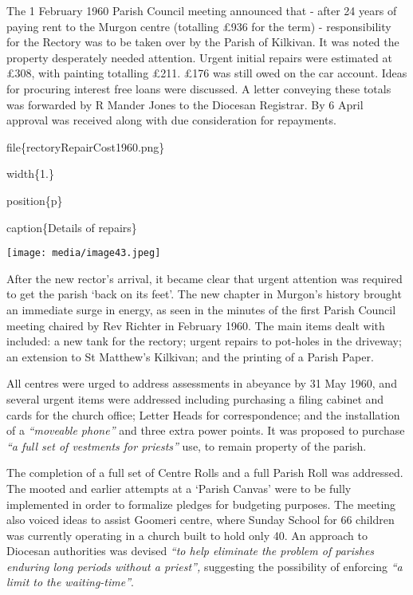 The 1 February 1960 Parish Council meeting announced that - after 24 years of paying rent to the Murgon centre (totalling £936 for the term) - responsibility for the Rectory was to be taken over by the Parish of Kilkivan. It was noted the property desperately needed attention. Urgent initial repairs were estimated at £308, with painting totalling £211. £176 was still owed on the car account. Ideas for procuring interest free loans were discussed. A letter conveying these totals was forwarded by R Mander Jones to the Diocesan Registrar. By 6 April approval was received along with due consideration for repayments.

file\{rectoryRepairCost1960.png\}

width\{1.\}

position\{p\}

caption\{Details of repairs\}

\texttt{[image: media/image43.jpeg]}

After the new rector's arrival, it became clear that urgent attention was required to get the parish `back on its feet'. The new chapter in Murgon's history brought an immediate surge in energy, as seen in the minutes of the first Parish Council meeting chaired by Rev Richter in February 1960. The main items dealt with included: a new tank for the rectory; urgent repairs to pot-holes in the driveway; an extension to St Matthew's Kilkivan; and the printing of a Parish Paper.

All centres were urged to address assessments in abeyance by 31 May 1960, and several urgent items were addressed including purchasing a filing cabinet and cards for the church office; Letter Heads for correspondence; and the installation of a \emph{``moveable phone''} and three extra power points. It was proposed to purchase \emph{``a full set of vestments for priests''} use, to remain property of the parish.

The completion of a full set of Centre Rolls and a full Parish Roll was addressed. The mooted and earlier attempts at a `Parish Canvas' were to be fully implemented in order to formalize pledges for budgeting purposes. The meeting also voiced ideas to assist Goomeri centre, where Sunday School for 66 children was currently operating in a church built to hold only 40. An approach to Diocesan authorities was devised \emph{``to help eliminate the problem of parishes enduring long periods without a priest'',} suggesting the possibility of enforcing \emph{``a limit to the waiting-time''}.

